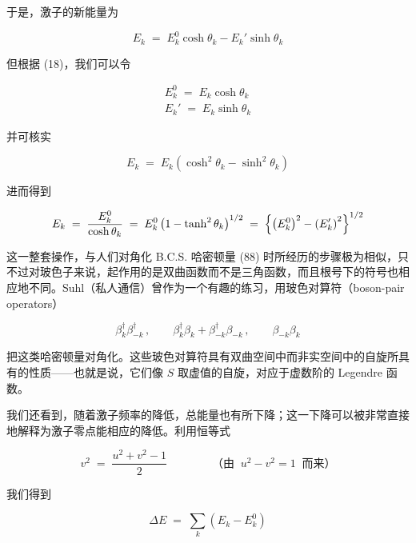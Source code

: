 于是，激子的新能量为

\begin{equation*}
E_k \;=\; E_k^{0}\cosh\theta_k - E_k'\sinh\theta_k
\end{equation*}

但根据 (18)，我们可以令

\begin{gather*}
E_k^{0} \;=\; E_k\cosh\theta_k \\
E_k' \;=\; E_k\sinh\theta_k
\end{gather*}

并可核实

\begin{equation*}
E_k \;=\; E_k\left(\cosh^{2}\theta_k - \sinh^{2}\theta_k\right)
\end{equation*}

进而得到

\begin{equation*}
E_k \;=\; \frac{E_k^{0}}{\cosh\theta_k} \;=\; E_k^{0}\left(1 - \tanh^{2}\theta_k\right)^{1/2} \;=\; \Bigl\{\left(E_k^{0}\right)^{2} - \left(E_k'\right)^{2}\Bigr\}^{1/2}
\end{equation*}

这一整套操作，与人们对角化 B.C.S. 哈密顿量 (88) 时所经历的步骤极为相似，只不过对玻色子来说，起作用的是双曲函数而不是三角函数，而且根号下的符号也相应地不同。Suhl（私人通信）曾作为一个有趣的练习，用玻色对算符（boson-pair operators）

\begin{equation*}
\beta_k^{\dagger}\beta_{-k}^{\dagger}\,, \qquad \beta_k^{\dagger}\beta_k + \beta_{-k}^{\dagger}\beta_{-k}\,, \qquad \beta_{-k}\beta_k
\end{equation*}

把这类哈密顿量对角化。这些玻色对算符具有双曲空间中而非实空间中的自旋所具有的性质——也就是说，它们像 $S$ 取虚值的自旋，对应于虚数阶的 Legendre 函数。

我们还看到，随着激子频率的降低，总能量也有所下降；这一下降可以被非常直接地解释为激子零点能相应的降低。利用恒等式

\begin{equation*}
v^{2} \;=\; \frac{u^{2} + v^{2} - 1}{2} \qquad\qquad \text{（由}\;\; u^{2} - v^{2} = 1\;\;\text{而来）}
\end{equation*}

我们得到

\begin{equation*}
\Delta E \;=\; \sum_{k}\left(E_k - E_k^{0}\right) \tag{19}
\end{equation*}

